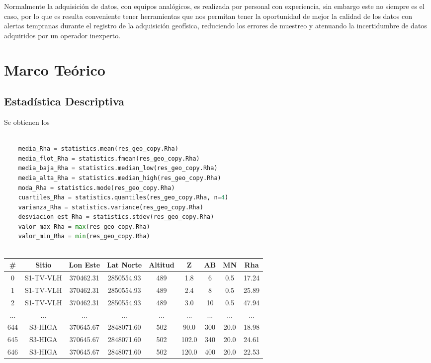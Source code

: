 \documentclass[sn-mathphys,Numbered]{sn-jnl}%
\theoremstyle{thmstyleone}%
\theoremstyle{thmstyletwo}%
\theoremstyle{thmstylethree}%
\begin{document}
Normalmente la adquisición de datos, con equipos analógicos, es realizada por personal con experiencia, sin embargo este no siempre es el caso, por lo que es resulta conveniente tener herramientas que nos permitan tener la oportunidad de mejor la calidad de los datos con alertas tempranas durante el registro de la adquisición geofísica, reduciendo los errores de muestreo y atenuando la incertidumbre de datos adquiridos por un operador inexperto.

\section{Marco Teórico}\label{sec2}

\subsection{Estadística Descriptiva}\label{subsec1}

Se obtienen los 

\begin{lstlisting}[language=python]
	
	media_Rha = statistics.mean(res_geo_copy.Rha)
	media_flot_Rha = statistics.fmean(res_geo_copy.Rha)
	media_baja_Rha = statistics.median_low(res_geo_copy.Rha)
	media_alta_Rha = statistics.median_high(res_geo_copy.Rha)
	moda_Rha = statistics.mode(res_geo_copy.Rha)
	cuartiles_Rha = statistics.quantiles(res_geo_copy.Rha, n=4)
	varianza_Rha = statistics.variance(res_geo_copy.Rha)
	desviacion_est_Rha = statistics.stdev(res_geo_copy.Rha)
	valor_max_Rha = max(res_geo_copy.Rha)
	valor_min_Rha = min(res_geo_copy.Rha)
	
\end{lstlisting}


\begin{center}
	\begin{tabular}{|c|c|c|c|c|c|c|c|c|}
	\hline
	 \#&Sitio & Lon Este & Lat Norte & Altitud & Z & AB & MN & Rha \\
	\hline
	 0&S1-TV-VLH&	370462.31&	2850554.93&	489&	1.8&	6&	0.5&	17.24\\	
	 1&S1-TV-VLH&	370462.31&	2850554.93&	489&	2.4&	8&	0.5&	25.89\\
	 2&S1-TV-VLH&	370462.31&	2850554.93&	489&	3.0&	10&	0.5&	47.94 \\
	...& ... &...  &...  &...  &...  &...  &...  &...  \\
	644&	S3-HIGA&	370645.67&	2848071.60&	502&	90.0&	300&	20.0&	18.98  \\
	645&	S3-HIGA&	370645.67&	2848071.60&	502&	102.0&	340&	20.0&	24.61 \\
	646&	S3-HIGA&	370645.67&	2848071.60&	502&	120.0&	400&	20.0&	22.53 \\
	\hline
\end{tabular}
\end{center}
\end{document}
